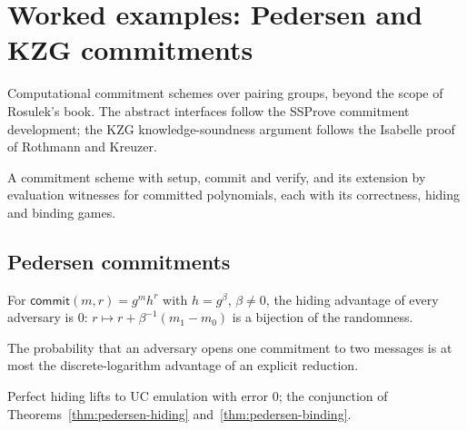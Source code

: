 \chapter{Worked examples: Pedersen and KZG commitments}

Computational commitment schemes over pairing groups, beyond the scope of
Rosulek's book. The abstract interfaces follow the SSProve commitment
development; the KZG knowledge-soundness argument follows the Isabelle proof of
Rothmann and Kreuzer.

\begin{definition}
  \label{def:commitment-abstract}
  \leanok
  A commitment scheme with setup, commit and verify, and its extension by
  evaluation witnesses for committed polynomials, each with its correctness,
  hiding and binding games.
\end{definition}

\section{Pedersen commitments}

\begin{theorem}
  \label{thm:pedersen-hiding}
  \leanok
  For $\mathsf{commit}(m, r) = g^m h^r$ with $h = g^\beta$, $\beta \neq 0$, the
  hiding advantage of every adversary is $0$: $r \mapsto r + \beta^{-1}(m_1 - m_0)$
  is a bijection of the randomness.
\end{theorem}

\begin{theorem}
  \label{thm:pedersen-binding}
  \leanok
  The probability that an adversary opens one commitment to two messages is at
  most the discrete-logarithm advantage of an explicit reduction.
\end{theorem}

\begin{theorem}
  \label{thm:pedersen-full}
  \leanok
  Perfect hiding lifts to UC emulation with error $0$; the conjunction of
  Theorems~\ref{thm:pedersen-hiding} and~\ref{thm:pedersen-binding}.
\end{theorem}

